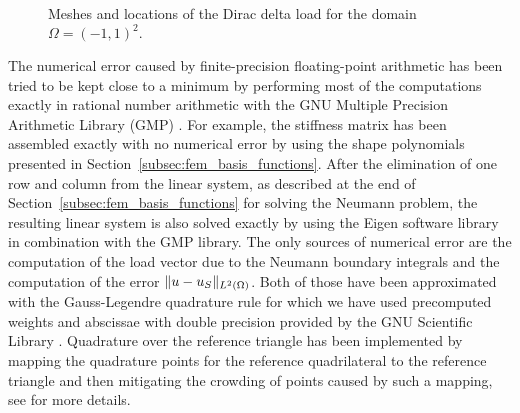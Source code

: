 \documentclass[english, 12pt, a4paper, sci, utf8, a-2b, online]{aaltothesis}
\theoremstyle{definition}
\theoremstyle{plain}
\DeclarePairedDelimiter\norm{\lVert}{\rVert}
\numberwithin{equation}{section}
\begin{document}
\begin{figure}[b]
    \centering
    \begin{subfigure}[t]{0.49\textwidth}
        \centering
    \end{subfigure}
    \begin{subfigure}[t]{0.49\textwidth}
        \centering
    \end{subfigure}
    \caption{Meshes and locations of the Dirac delta load for the domain $\Omega = (-1,1)^2.$}
    \label{fig:numerical_results_meshes_and_load}
\end{figure}

The numerical error caused by finite-precision floating-point arithmetic
has been tried to be kept close to a minimum by performing most of the computations exactly
in rational number arithmetic with the GNU Multiple Precision Arithmetic Library (GMP) \cite{gmp}.
For example, the stiffness matrix has been assembled exactly with no numerical error
by using the shape polynomials presented in Section~\ref{subsec:fem_basis_functions}.
After the elimination of one row and column from the linear system,
as described at the end of Section~\ref{subsec:fem_basis_functions}
for solving the Neumann problem, the resulting linear system is also solved exactly
by using the Eigen software library \cite{eigen} in combination with the GMP library.
The only sources of numerical error are the computation of the load vector
due to the Neumann boundary integrals and the computation of the error
$\norm{u - u_S}_{L^2(\Omega)}$. Both of those have been approximated with the
Gauss-Legendre quadrature rule for which we have used precomputed weights and abscissae
with double precision provided by the GNU Scientific Library \cite{gsl}.
Quadrature over the reference triangle has been implemented by mapping the quadrature points
for the reference quadrilateral to the reference triangle and
then mitigating the crowding of points caused by such a mapping,
see \cite{Hussain2012AppropriateGQ} for more details.
\end{document}
